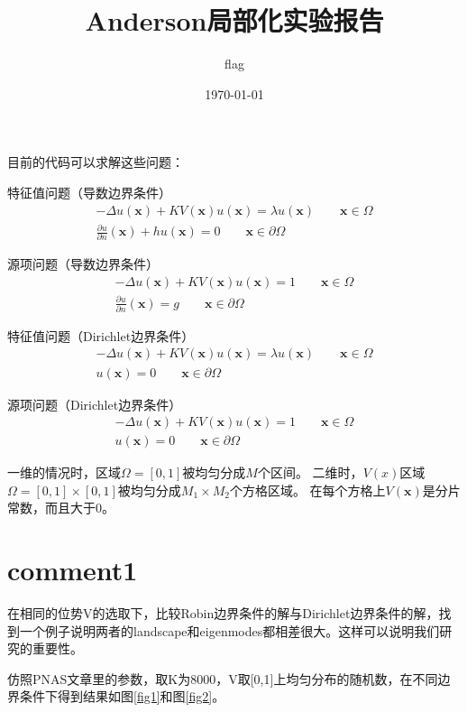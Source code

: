 \documentclass[UTF8,12pt]{article}
\title{Anderson局部化实验报告}
\author{flag}
\date{\today}
\begin{document}
    
\maketitle

目前的代码可以求解这些问题：

特征值问题（导数边界条件）
\begin{eqnarray}
- \Delta u(\mathbf{x}) + KV(\mathbf{x}) u(\mathbf{x}) = \lambda u(\mathbf{x}) \qquad \mathbf{x} \in \Omega \\
\frac{\partial u}{\partial n}(\mathbf{x}) + h u(\mathbf{x}) = 0 \qquad \mathbf{x} \in \partial \Omega
\end{eqnarray}

源项问题（导数边界条件）
\begin{eqnarray}
- \Delta u(\mathbf{x}) + KV(\mathbf{x}) u(\mathbf{x}) = 1 \qquad \mathbf{x} \in \Omega \\
\frac{\partial u}{\partial n}(\mathbf{x}) = g \qquad \mathbf{x} \in \partial \Omega
\end{eqnarray}

特征值问题（Dirichlet边界条件）
\begin{eqnarray}
- \Delta u(\mathbf{x}) + KV(\mathbf{x}) u(\mathbf{x}) = \lambda u(\mathbf{x}) \qquad \mathbf{x} \in \Omega \\
u(\mathbf{x}) = 0 \qquad \mathbf{x} \in \partial \Omega
\end{eqnarray}

源项问题（Dirichlet边界条件）
\begin{eqnarray}
- \Delta u(\mathbf{x}) + KV(\mathbf{x}) u(\mathbf{x}) = 1 \qquad \mathbf{x} \in \Omega \\
u(\mathbf{x}) = 0 \qquad \mathbf{x} \in \partial \Omega
\end{eqnarray}

一维的情况时，区域$\Omega=[0,1]$被均匀分成$M$个区间。
二维时，$V(x)$区域$\Omega=[0,1] \times [0,1]$被均匀分成$M_1 \times M_2$个方格区域。
在每个方格上$V(\mathbf{x})$是分片常数，而且大于0。

\section{comment1}
    
在相同的位势V的选取下，比较Robin边界条件的解与Dirichlet边界条件的解，找到一个例子说明两者的landscape和eigenmodes都相差很大。这样可以说明我们研究的重要性。

仿照PNAS文章里的参数，取K为8000，V取[0,1]上均匀分布的随机数，在不同边界条件下得到结果如图\ref{fig1}和图\ref{fig2}。
\end{document}
